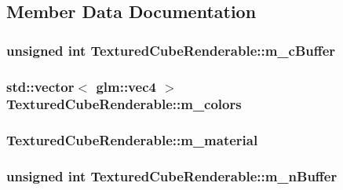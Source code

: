 \subsection{Member Data Documentation}
\hypertarget{classTexturedCubeRenderable_aeddfc02d05a09c1a233c3ed6c266c4da}{
\subsubsection[{m\+\_\+c\+Buffer}]{\setlength{\rightskip}{0pt plus 5cm}unsigned int Textured\+Cube\+Renderable\+::m\+\_\+c\+Buffer\hspace{0.3cm}{\ttfamily [private]}}}\label{classTexturedCubeRenderable_aeddfc02d05a09c1a233c3ed6c266c4da}
\hypertarget{classTexturedCubeRenderable_ab950dfea6aea614a9eef369a504447e0}{
\subsubsection[{m\+\_\+colors}]{\setlength{\rightskip}{0pt plus 5cm}std\+::vector$<$ glm\+::vec4 $>$ Textured\+Cube\+Renderable\+::m\+\_\+colors\hspace{0.3cm}{\ttfamily [private]}}}\label{classTexturedCubeRenderable_ab950dfea6aea614a9eef369a504447e0}
\hypertarget{classTexturedCubeRenderable_a2e567d5bdb44623b91a748761d7d4ee6}{
\subsubsection[{m\+\_\+material}]{ Textured\+Cube\+Renderable\+::m\+\_\+material\hspace{0.3cm}{\ttfamily [private]}}}\label{classTexturedCubeRenderable_a2e567d5bdb44623b91a748761d7d4ee6}
\hypertarget{classTexturedCubeRenderable_a165074001bbe9213adf5de7c8232f454}{
\subsubsection[{m\+\_\+n\+Buffer}]{\setlength{\rightskip}{0pt plus 5cm}unsigned int Textured\+Cube\+Renderable\+::m\+\_\+n\+Buffer\hspace{0.3cm}{\ttfamily [private]}}}\label{classTexturedCubeRenderable_a165074001bbe9213adf5de7c8232f454}
